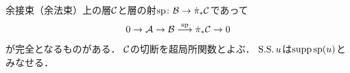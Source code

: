 \begin{RMK}
  余接束（余法束）上の層\(\mathcal{C}\)と層の射\(
    \mathrm{sp}\colon \mathcal{B}\to \dot{\pi}_{\ast}\mathcal{C}
  \)であって
  \[
    0
    \to 
    \mathcal{A}
    \to 
    \mathcal{B}
    \overset{\mathrm{sp}}{\longrightarrow} 
    \dot{\pi}_{\ast}
    \mathcal{C}
    \to 0
  \]
  が完全となるものがある．
  \(\mathcal{C}\)の切断を超局所関数とよぶ．
  \(\operatorname{\mathrm{S}\text{.}\mathrm{S}\text{.}} {u}\)は\(\mathop{\mathrm{supp}}\nolimits \mathrm{sp}(u)\)とみなせる．
\end{RMK}

